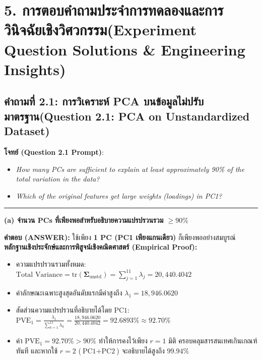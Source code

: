 \documentclass[12pt,a4paper]{article}
\begin{document}
\section*{5. การตอบคำถามประจำการทดลองและการวินิจฉัยเชิงวิศวกรรม\newline \large(Experiment Question Solutions \& Engineering Insights)}
\vspace{-0.6em}
\subsection*{คำถามที่ 2.1: การวิเคราะห์ PCA บนข้อมูลไม่ปรับมาตรฐาน\newline \normalsize(Question 2.1: PCA on Unstandardized Dataset)}
\vspace{-0.5em}

\begin{ansbox}[fontupper=\small, left=6pt, right=6pt, top=3pt, bottom=3pt]
\textbf{โจทย์ (Question 2.1 Prompt)}:
\begin{itemize}[leftmargin=1.2em, itemsep=0pt, topsep=0pt, parsep=0pt]
    \item[(a)] \textit{How many PCs are sufficient to explain at least approximately 90\% of the total variation in the data?}
    \item[(b)] \textit{Which of the original features get large weights (loadings) in PC1?}
\end{itemize}

\vspace{-0.2em}
\noindent\rule{\linewidth}{0.4pt}
\vspace{-0.2em}

\noindent\textbf{\normalsize (a) จำนวน PCs ที่เพียงพอสำหรับอธิบายความแปรปรวนรวม $\ge 90\%$}\par\vspace{0.05em}
\textbf{คำตอบ (ANSWER):} ใช้เพียง \textbf{1 PC (PC1 เพียงแกนเดียว)} ก็เพียงพออย่างสมบูรณ์\\[0.05em]
\textbf{หลักฐานเชิงประจักษ์และการพิสูจน์เชิงคณิตศาสตร์ (Empirical Proof):}
\begin{itemize}[leftmargin=1.3em, itemsep=0.5pt, topsep=0.5pt]
    \item ความแปรปรวนรวมทั้งหมด: $\text{Total Variance} = \text{tr}(\boldsymbol{\Sigma}_{\text{unstd}}) = \sum_{j=1}^{11} \lambda_j = 20,440.4042$
    \item ค่าลักษณะเฉพาะสูงสุดอันดับแรกมีค่าสูงถึง $\lambda_1 = 18,946.0620$
    \item สัดส่วนความแปรปรวนที่อธิบายได้โดย $\text{PC1}$: $\text{PVE}_1 = \frac{\lambda_1}{\sum_{k=1}^{11} \lambda_k} = \frac{18,946.0620}{20,440.4042} = \mathbf{92.6893\% \approx 92.70\%}$
    \item ค่า $\text{PVE}_1 = 92.70\% > 90\%$ ทำให้การคงไว้เพียง $r=1$ มิติ ครอบคลุมสารสนเทศเกินเกณฑ์ทันที และหากใช้ $r=2$ ($\text{PC1} + \text{PC2}$) จะอธิบายได้สูงถึง $\mathbf{99.94\%}$
\end{itemize}


\end{ansbox}
\end{document}
